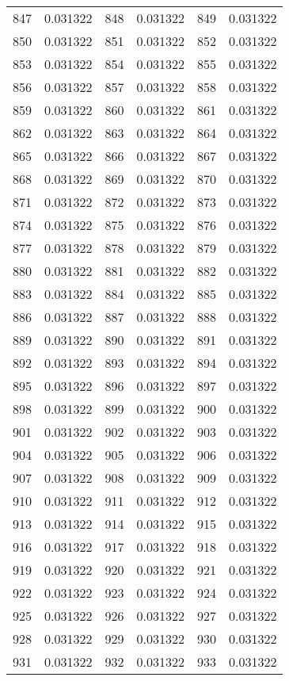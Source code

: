 \documentclass[12pt]{article}
\begin{document}
\begin{longtable}{@{}cc|cc|cc@{}}
847 & 0.031322 & 848 & 0.031322 & 849 & 0.031322 \\
850 & 0.031322 & 851 & 0.031322 & 852 & 0.031322 \\
853 & 0.031322 & 854 & 0.031322 & 855 & 0.031322 \\
856 & 0.031322 & 857 & 0.031322 & 858 & 0.031322 \\
859 & 0.031322 & 860 & 0.031322 & 861 & 0.031322 \\
862 & 0.031322 & 863 & 0.031322 & 864 & 0.031322 \\
865 & 0.031322 & 866 & 0.031322 & 867 & 0.031322 \\
868 & 0.031322 & 869 & 0.031322 & 870 & 0.031322 \\
871 & 0.031322 & 872 & 0.031322 & 873 & 0.031322 \\
874 & 0.031322 & 875 & 0.031322 & 876 & 0.031322 \\
877 & 0.031322 & 878 & 0.031322 & 879 & 0.031322 \\
880 & 0.031322 & 881 & 0.031322 & 882 & 0.031322 \\
883 & 0.031322 & 884 & 0.031322 & 885 & 0.031322 \\
886 & 0.031322 & 887 & 0.031322 & 888 & 0.031322 \\
889 & 0.031322 & 890 & 0.031322 & 891 & 0.031322 \\
892 & 0.031322 & 893 & 0.031322 & 894 & 0.031322 \\
895 & 0.031322 & 896 & 0.031322 & 897 & 0.031322 \\
898 & 0.031322 & 899 & 0.031322 & 900 & 0.031322 \\
901 & 0.031322 & 902 & 0.031322 & 903 & 0.031322 \\
904 & 0.031322 & 905 & 0.031322 & 906 & 0.031322 \\
907 & 0.031322 & 908 & 0.031322 & 909 & 0.031322 \\
910 & 0.031322 & 911 & 0.031322 & 912 & 0.031322 \\
913 & 0.031322 & 914 & 0.031322 & 915 & 0.031322 \\
916 & 0.031322 & 917 & 0.031322 & 918 & 0.031322 \\
919 & 0.031322 & 920 & 0.031322 & 921 & 0.031322 \\
922 & 0.031322 & 923 & 0.031322 & 924 & 0.031322 \\
925 & 0.031322 & 926 & 0.031322 & 927 & 0.031322 \\
928 & 0.031322 & 929 & 0.031322 & 930 & 0.031322 \\
931 & 0.031322 & 932 & 0.031322 & 933 & 0.031322 \\

\end{longtable}
\end{document}
